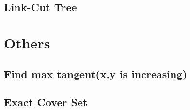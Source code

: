 \documentclass[a4paper,10pt,twocolumn,oneside]{article}
\begin{document}
\subsection{Link-Cut Tree}


%

%

%

%

\section{Others}

\subsection{Find max tangent(x,y is increasing)}


\subsection{Exact Cover Set}


%

%
\end{document}
